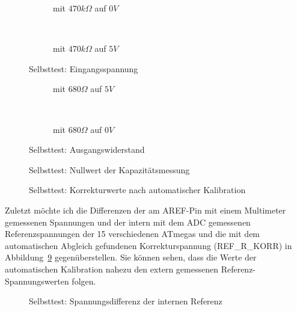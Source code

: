 \begin{figure}[H]
  \begin{subfigure}[b]{9cm}
  \centering
    \resizebox{9cm}{!}{}
    \caption{mit \(470k\Omega\) auf \(0V\)}
    \label{fig:SelfTlowH}
  \end{subfigure}
  ~
  \begin{subfigure}[b]{9cm}
  \centering
    \resizebox{9cm}{!}{}
    \caption{mit \(470k\Omega\) auf \(5V\)}
    \label{fig:SelfTtopH}
  \end{subfigure}
  \caption{Selbsttest: Eingangsspannung}
\end{figure}

\begin{figure}[H]
  \begin{subfigure}[b]{9cm}
  \centering
    \resizebox{9cm}{!}{}
    \caption{mit \(680\Omega\) auf \(5V\)}
    \label{fig:SelfTRoL}
  \end{subfigure}
  ~
  \begin{subfigure}[b]{9cm}
  \centering
    \resizebox{9cm}{!}{}
    \caption{mit \(680\Omega\) auf \(0V\)}
    \label{fig:SelfTRoH}
  \end{subfigure}
  \caption{Selbsttest: Ausgangswiderstand}
\end{figure}

\begin{figure}[H]
  \centering
  \resizebox{9cm}{!}{}
  \caption{Selbsttest: Nullwert der Kapazitätsmessung}
  \label{fig:SelfTcap}
\end{figure}

\begin{figure}[H]
  \centering
  \resizebox{9cm}{!}{}
  \caption{Selbsttest: Korrekturwerte nach automatischer Kalibration}
  \label{fig:SelfTrefKorr}
\end{figure}

Zuletzt möchte ich die Differenzen der am AREF-Pin mit einem Multimeter
gemessenen Spannungen und der intern mit dem ADC gemessenen Referenzspannungen der
15 verschiedenen ATmegas und die mit dem automatischen Abgleich
gefundenen Korrekturspannung (REF\_R\_KORR) in Abbildung~\ref{fig:SelfTrefDiff} gegenüberstellen.
Sie können sehen, dass die Werte der automatischen Kalibration nahezu den extern
gemessenen Referenz-Spannungswerten folgen.

\begin{figure}[H]
  \centering
  \resizebox{9cm}{!}{}
  \caption{Selbsttest: Spannungsdifferenz der internen Referenz}
  \label{fig:SelfTrefDiff}
\end{figure}

